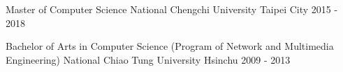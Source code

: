 

\begin{cventries}

  \cventry
    {Master of Computer Science} %
    {National Chengchi University} %
    {Taipei City} %
    {2015 - 2018} %
    {
    }

  \cventry
    {Bachelor of Arts in Computer Science (Program of Network and Multimedia Engineering)} %
    {National Chiao Tung University} %
    {Hsinchu} %
    {2009 - 2013} %
    {
    }

\end{cventries}
